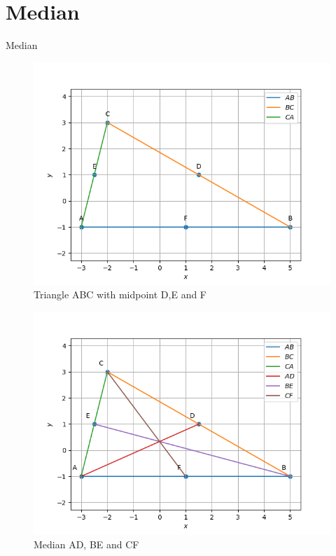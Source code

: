 \documentclass[journal,12pt,twocolumn]{IEEEtran}
\theoremstyle{remark}
\begin{document}
\section{Median}
\begin{table}[!ht]
	
	\caption{Median}
	\label{tab:Median}	
\end{table}
\begin{figure}[!ht]
              \centering
              \includegraphics[width=\columnwidth]{./figs/fig1.2.1.png}
              \caption{Triangle ABC with midpoint D,E and F}
              \label{fig:3}
\end{figure}
\begin{figure}[!ht]
              \centering
              \includegraphics[width=\columnwidth]{./figs/fig1.2.2.png}
              \caption{Median AD, BE and CF}
              \label{fig:4}
\end{figure}
\end{document}
